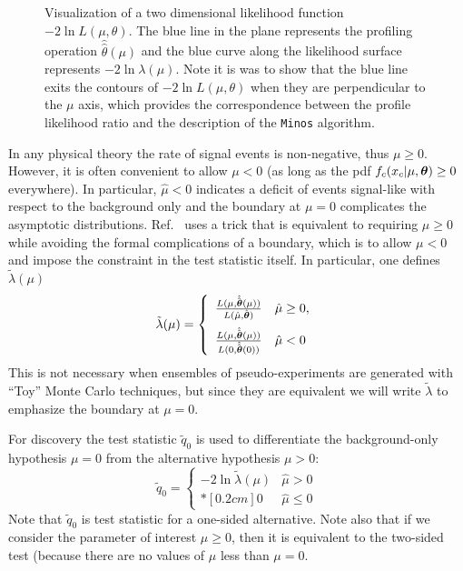 \documentclass{cernrep}
\def\vec#1{\ifmmode
\mathchoice{\mbox{\boldmath$\displaystyle\bf#1$}}
{\mbox{\boldmath$\textstyle\bf#1$}}
{\mbox{\boldmath$\scriptstyle\bf#1$}}
{\mbox{\boldmath$\scriptscriptstyle\bf#1$}}\else
{\mbox{\boldmath$\bf#1$}}\fi}
\begin{document}
\begin{figure}[h]
\begin{center}
\caption{Visualization of a two dimensional likelihood function $-2\ln L(\mu,\theta)$.  The blue line in the plane represents the profiling operation $\hat{\hat{\theta}}(\mu)$ and the blue curve along the likelihood surface represents $-2\ln \lambda(\mu)$.  Note it is was to show that the blue line exits the contours of $-2\ln L(\mu,\theta)$ when they are perpendicular to the $\mu$ axis, which provides the correspondence between the profile likelihood ratio and the description of the \texttt{Minos} algorithm.}
\label{fig:profileLR}
\end{center}
\end{figure}


In any physical theory the rate of signal events is non-negative, thus $\mu\ge 0$.  However, it is often convenient to allow $\mu<0$ (as long as the pdf $f_c(x_c | \mu,\vec\theta)\ge 0$ everywhere).  In particular, $\hat\mu<0$ indicates a deficit of events signal-like with respect to the background only and the boundary at $\mu=0$ complicates the asymptotic distributions.  Ref.~\cite{asimov} uses a  trick that is equivalent to requiring $\mu\ge 0$ while avoiding the formal complications of a boundary, which is to allow $\mu< 0$ and   impose the constraint in the test statistic itself.  In particular, one defines $\tilde \lambda(\mu)$
\begin{equation}
\label{eq:lambdatilde}  \tilde{\lambda}({\mu}) =  \left\{ 
\begin{array}{ll} \frac{ L(\mu, \hat{\hat{\vec{\theta}}}(\mu)) }
{L(\hat{\mu}, \hat{\vec{\theta}}) } & \hat{\mu} \ge 0 , \\*[0.3 cm]
\frac{ L(\mu, \hat{\hat{\vec{\theta}}}(\mu)) }  {L(0,
\hat{\hat{\vec{\theta}}}(0)) } & \hat{\mu} < 0 
              \end{array} \right.
\end{equation}
This is not necessary when ensembles of pseudo-experiments are generated with ``Toy'' Monte Carlo techniques, but since they are equivalent we will write $\tilde\lambda$ to emphasize the boundary at $\mu=0$.


For discovery the test statistic $\tilde{q}_0$  is used to differentiate the background-only hypothesis $\mu=0$ from the alternative hypothesis $\mu>0$:
\begin{equation}
\tilde{q}_{0} =  \left\{ \!
\! \begin{array}{ll} - 2 \ln \tilde{\lambda}(\mu)  & \hat{\mu} > 0
\\*[0.2 cm] 0 & \hat{\mu} \le 0 
              \end{array} \right.  
\end{equation}
Note that $\tilde{q}_0$ is test statistic for a one-sided alternative.  Note also that if we consider the parameter of interest $\mu\ge 0$, then it is equivalent to the two-sided test (because there are no values of $\mu$ less than $\mu=0$. 
\end{document}
